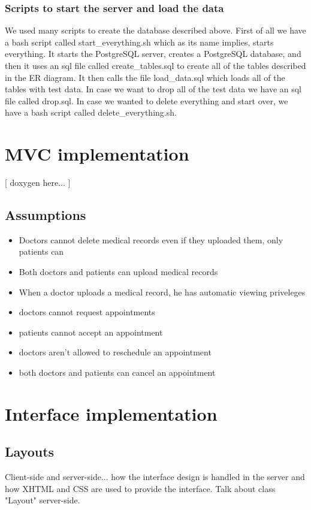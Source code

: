 \documentclass[12pt]{report}
\begin{document}
\subsubsection{Scripts to start the server and load the data}
We used many scripts to create the database described above.  First of all we have a bash script called start\_everything.sh which as its name implies, starts everything.  It starts the PostgreSQL server, creates a PostgreSQL database, and then it uses an sql file called create\_tables.sql to create all of the tables described in the ER diagram.  It then calls the file load\_data.sql which loads all of the tables with test data.  In case we want to drop all of the test data we have an sql file called drop.sql.  In case we wanted to delete everything and start over, we have a bash script called delete\_everything.sh. 

\section{MVC implementation}
[ doxygen here... ]

\subsection{Assumptions}
\begin{itemize}
\item Doctors cannot delete medical records even if they uploaded them, only patients can
\item Both doctors and patients can upload medical records
\item When a doctor uploads a medical record, he has automatic viewing priveleges
\item doctors cannot request appointments
\item patients cannot accept an appointment
\item doctors aren't allowed to reschedule an appointment
\item both doctors and patients can cancel an appointment
\end{itemize}

\section{Interface implementation}
\subsection{Layouts}
Client-side and server-side... how the interface design is handled in the server and how XHTML and CSS are used to provide the interface. Talk about class "Layout" server-side.
\end{document}
